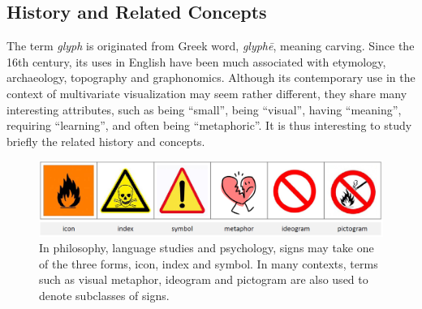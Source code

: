 
\subsection{History and Related Concepts}\label{sec:Theory}
The term \emph{glyph} is originated from Greek word, \emph{glyph\={e}}, meaning carving. Since the 16th century, its uses in English have been much associated with etymology, archaeology, topography and graphonomics. Although its contemporary use in the context of multivariate visualization may seem rather different, they share many interesting attributes, such as being ``small'', being ``visual'', having ``meaning'', requiring ``learning'', and often being ``metaphoric''. It is thus interesting to study briefly the related history and concepts.    

\begin{figure}[!h]
  \centering
  \includegraphics[width=162mm]{images/related-work-glyphs/Signs.png}
  \caption{In philosophy, language studies and psychology, signs may take one of the three forms, icon, index and symbol. In many contexts, terms such as visual metaphor, ideogram and pictogram are also used to denote subclasses of signs.\label{fig:Signs}}
\end{figure}


